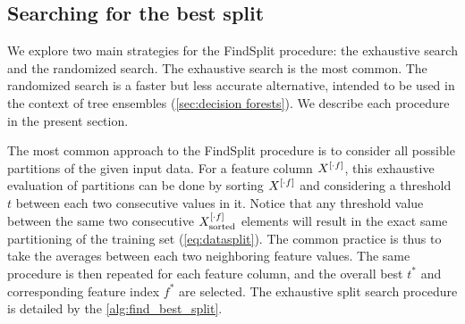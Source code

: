 %


\subsection{Searching for the best split}
\label{sec:split search}

We explore two main strategies for the FindSplit procedure: the exhaustive search and the randomized search. The exhaustive search is the most common. The randomized search is a faster but less accurate alternative, intended to be used in the context of tree ensembles (\autoref{sec:decision forests}). We describe each procedure in the present section.

The most common approach to the FindSplit procedure is to consider all possible partitions of the given input data.
%
For a feature column $X^{[\cdot f]}$, this exhaustive evaluation of partitions can be done by sorting $X^{[\cdot f]}$ and considering a threshold $t$ between each two consecutive values in it. Notice that any threshold value between the same two consecutive $X^{[\cdot f]}_\text{sorted}$ elements will result in the exact same partitioning of the training set (\autoref{eq:datasplit}). The common practice is thus to take the averages between each two neighboring feature values. The same procedure is then repeated for each feature column, and the overall best $t^\ast$ and corresponding feature index $f^\ast$ are selected.
%
%
The exhaustive split search procedure is detailed by the \autoref{alg:find_best_split}.

